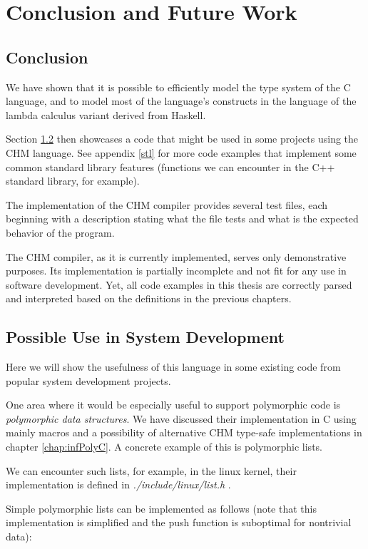 
\chapter{Conclusion and Future Work}

\section{Conclusion}

We have shown that it is possible to efficiently model the type system of the C language, and to model most of the language's constructs in the language of the lambda calculus variant derived from Haskell.

Section \ref{ex:list} then showcases a code that might be used in some projects using the CHM language. See appendix \ref{stl} for more code examples that implement some common standard library features (functions we can encounter in the C++ standard library, for example).

The implementation of the CHM compiler provides several test files, each beginning with a description stating what the file tests and what is the expected behavior of the program.

The CHM compiler, as it is currently implemented, serves only demonstrative purposes. Its implementation is partially incomplete and not fit for any use in software development. Yet, all code examples in this thesis are correctly parsed and interpreted based on the definitions in the previous chapters.

\section{Possible Use in System Development}
\label{ex:list}

Here we will show the usefulness of this language in some existing code from popular system development projects.

One area where it would be especially useful to support polymorphic code is \emph{polymorphic data structures}. We have discussed their implementation in C using mainly macros and a possibility of alternative CHM type-safe implementations in chapter \ref{chap:infPolyC}. A concrete example of this is polymorphic lists.

We can encounter such lists, for example, in the linux kernel, their implementation is defined in \emph{./include/linux/list.h} \cite{torvalds2018linux}.

Simple polymorphic lists can be implemented as follows (note that this implementation is simplified and the push function is suboptimal for nontrivial data):

